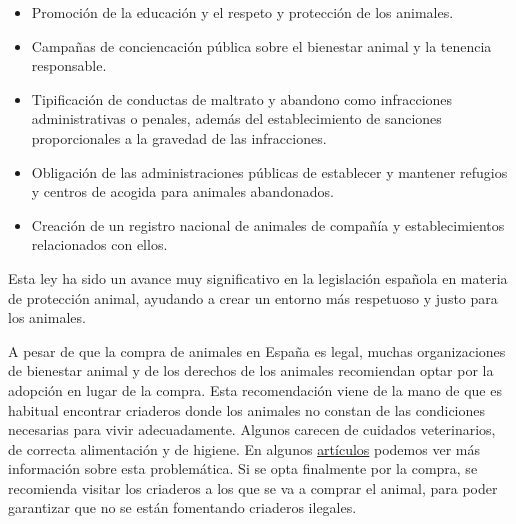 \documentclass[a4paper, 12pt]{article}
\begin{document}
\begin{itemize}
	\begin{itemize}
	\item Promoción de la educación y el respeto y protección de los animales.
	\item Campañas de conciencación pública sobre el bienestar animal y la tenencia responsable.
	\item Tipificación de conductas de maltrato y abandono como infracciones administrativas o penales, además del establecimiento de sanciones proporcionales a la gravedad de las infracciones.
	\item Obligación de las administraciones públicas de establecer y mantener refugios y centros de acogida para animales abandonados.
	\item Creación de un registro nacional de animales de compañía y establecimientos relacionados con ellos.
	\end{itemize}
\end{itemize}

Esta ley ha sido un avance muy significativo en la legislación española en materia de protección animal, ayudando a crear un entorno más respetuoso y justo para los animales. 

A pesar de que la compra de animales en España es legal, muchas organizaciones de bienestar animal y de los derechos de los animales recomiendan optar por la adopción en lugar de la compra. Esta recomendación viene de la mano de que  es habitual encontrar criaderos donde los animales no constan de las condiciones necesarias para vivir adecuadamente. Algunos carecen de cuidados veterinarios, de correcta alimentación y de higiene. En algunos \href{https://investigaciones.petalatino.com/animales-sufren-comercio-mascotas/}{artículos} podemos ver más información sobre esta problemática. Si se opta finalmente por la compra, se recomienda visitar los criaderos a los que se va a comprar el animal, para poder garantizar que no se están fomentando criaderos ilegales. 
\end{document}
